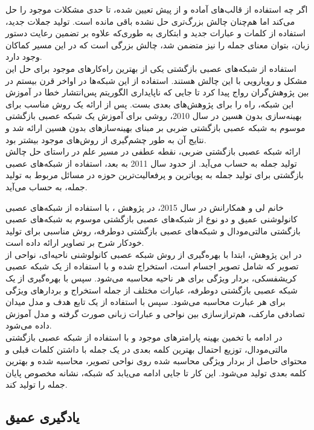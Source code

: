 \begin{enumerate}
اگر چه استفاده از قالب‌های آماده و از پیش تعیین شده، تا حدی مشکلات موجود را حل می‌کند اما هم‌چنان چالش بزرگ‌تری حل نشده باقی مانده است. تولید جملات جدید، استفاده از کلمات و عبارات جدید و ابتکاری به طوری‌که علاوه بر تضمین رعایت دستور زبان، بتوان معنای جمله را نیز متضمن شد، چالش بزرگی است که در این مسیر کماکان وجود دارد.
\\
استفاده از شبکه‌های عصبی بازگشتی یکی از بهترین راه‌کارهای موجود برای حل این مشکل و رویارویی با این چالش هستند. استفاده از این شبکه‌ها در اواخر قرن بیستم در بین پژوهش‌گران رواج پیدا کرد تا جایی که ناپایداری الگوریتم پس‌انتشار خطا در آموزش این شبکه، راه را برای پژوهش‌های بعدی بست. پس از ارائه یک روش مناسب برای بهینه‌سازی بدون هسین در سال 2010، روشی برای آموزش یک شبکه عصبی بازگشتی موسوم به شبکه عصبی بازگشتی ضربی بر مبنای بهینه‌سازهای بدون هسین ارائه شد و نتایج آن به طور چشم‌گیری از روش‌های موجود بیشتر بود.
\\
ارائه شبکه عصبی بازگشتی ضربی، نقطه عطفی در مسیر علم در راستای حل چالش تولید جمله به حساب می‌آید. از حدود سال 2011 به بعد، استفاده از شبکه‌های عصبی بازگشتی برای تولید جمله به پویاترین و پرفعالیت‌ترین حوزه در مسائل مربوط به تولید جمله، به حساب می‌آید.
\end{enumerate}

خانم لی و همکارانش در سال 2015، در پژوهش \cite{karpathy2015deep}، با استفاده از شبکه‌های عصبی کانولوشنی عمیق و دو نوع از شبکه‌های عصبی بازگشتی موسوم به شبکه‌های عصبی بازگشتی مالتی‌مودال و شبکه‌های عصبی بازگشتی دوطرفه، روش مناسبی برای تولید خودکار شرح بر تصاویر ارائه داده است.
\\
در این پژوهش، ابتدا با بهره‌گیری از روش شبکه عصبی کانولوشنی ناحیه‌ای، نواحی از تصویر که شامل تصویر اجسام است، استخراج شده و با استفاده از یک شبکه عصبی کریشفسکی، بردار ویژگی برای هر ناحیه محاسبه می‌شود. سپس با بهره‌گیری از یک شبکه عصبی بازگشتی دوطرفه، عبارات مختلف از جمله استخراج و بردارهای ویژگی برای هر عبارت محاسبه می‌شود. سپس با استفاده از یک تابع هدف و مدل میدان تصادفی مارکف، هم‌ترازسازی بین نواحی و عبارات زبانی صورت گرفته و مدل آموزش داده می‌شود.
\\
 در ادامه با تخمین بهینه پارامترهای موجود و با استفاده از شبکه عصبی بازگشتی مالتی‌مودال، توزیع احتمال بهترین کلمه بعدی در یک جمله با داشتن کلمات قبلی و محتوای حاصل از بردار ویژگی محاسبه شده روی نواحی تصویر، محاسبه شده و بهترین کلمه بعدی تولید می‌شود. این کار تا جایی ادامه می‌یابد که شبکه، نشانه مخصوص پایان جمله را تولید کند.


\subsection{یادگیری عمیق}


